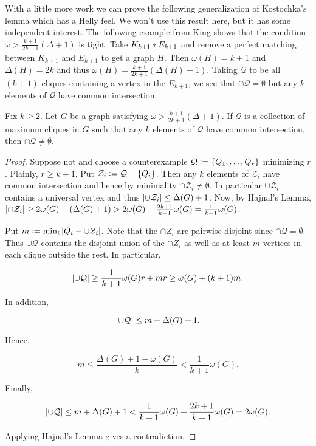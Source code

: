 With a little more work we can prove the following generalization of Kostochka's lemma which has a Helly feel.  
We won't use this result here, but it has some independent interest.  The
following example from King \cite{KingPersonalKostochkaGeneralized} shows that
the condition $\omega > \frac{k+1}{2k+1} (\Delta + 1)$ is tight.  Take
$K_{k+1} \mbox{\hspace{2 pt}$\ast$\hspace{2 pt}} E_{k+1}$ and remove a perfect matching between $K_{k+1}$ and
$E_{k+1}$ to get a graph $H$.  Then $\omega(H) = k + 1$ and $\Delta(H) = 2k$ and
thus $\omega(H) = \frac{k+1}{2k+1} (\Delta(H) + 1)$.  Taking $\mathcal{Q}$ to be
all $(k+1)$-cliques containing a vertex in the $E_{k+1}$, we see that $\cap
\mathcal{Q} = \emptyset$ but any $k$ elements of $\mathcal{Q}$ have common
intersection.

\begin{lem}\label{KostochkaGeneralized}
Fix $k \geq 2$. Let $G$ be a graph satisfying $\omega > \frac{k+1}{2k+1} (\Delta + 1)$.  
If $\mathcal{Q}$ is a collection of maximum cliques in $G$ such that any $k$ elements of $\mathcal{Q}$ have common intersection, then $\cap \mathcal{Q} \neq \emptyset$.
\end{lem}
\begin{proof}
Suppose not and choose a counterexample $\mathcal{Q} \mathrel{\mathop:}= \left\{ Q_1, \ldots, Q_r \right\}$ minimizing $r$. Plainly, $r \geq k + 1$.  Put $\mathcal{Z}_i \mathrel{\mathop:}= \mathcal{Q} - \left\{ Q_i \right\}$.  Then any $k$ elements of $\mathcal{Z}_i$ have common intersection and hence by minimality $\cap \mathcal{Z}_i \neq \emptyset$. In particular $\cup \mathcal{Z}_i$ contains a universal vertex and thus $\left|\cup \mathcal{Z}_i\right| \leq \Delta(G) + 1$. Now, by Hajnal's Lemma, $\left|\cap \mathcal{Z}_i\right| \geq 2\omega(G) - (\Delta(G) + 1) > 2\omega(G) - \frac{2k+1}{k+1} \omega(G) = \frac{1}{k+1}\omega(G)$.

Put $m \mathrel{\mathop:}= \min_i \left|Q_i - \cup  \mathcal{Z}_i\right|$.  Note that the $\cap Z_i$ are pairwise disjoint since $\cap \mathcal{Q} = \emptyset$. Thus $\cup \mathcal{Q}$ contains the disjoint union of the $\cap Z_i$ as well as at least $m$ vertices in each clique outside the rest. In particular,

\[\left|\cup \mathcal{Q}\right| \geq \frac{1}{k+1}\omega(G) r + mr \geq \omega(G) + (k+1)m.\]

\noindent In addition, 

\[\left|\cup \mathcal{Q}\right| \leq m + \Delta(G) + 1.\]

\noindent Hence,

\[m \leq \frac{\Delta(G) + 1 - \omega(G)}{k} < \frac{1}{k+1}\omega(G).\]

\noindent Finally,

\[\left|\cup \mathcal{Q}\right| \leq m + \Delta(G) + 1 < \frac{1}{k+1}\omega(G) + \frac{2k+1}{k+1}\omega(G) = 2\omega(G).\]

\noindent Applying Hajnal's Lemma gives a contradiction.
\end{proof}

